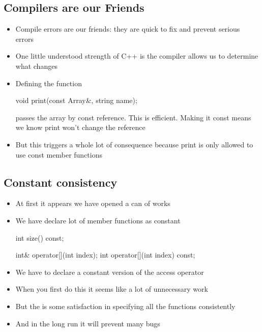 
\begin{slide}
\section{Compilers are our Friends}

\begin{itemize}
\item Compile errors are our friends\pause: they are quick to fix and
  prevent serious errors
\item One little understood strength of C++ is the compiler allows us
  to determine what changes
\item Defining the function
  \begin{cpp}
    void print(const Array&, string name);
  \end{cpp}
  \vspace*{-1cm}
  passes the array by const reference.  This is efficient.  Making it
  const means we know print won't change the reference
\item But this triggers a whole lot of consequence because print is
  only allowed to use const member functions
\end{itemize}
\end{slide}


\begin{slide}
\section[-1]{Constant consistency}

\begin{itemize}
\item At first it appears we have opened a can of works
\item We have declare lot of member functions as constant
  \begin{cpp}
    int size() const;

    int& operator[](int index);
    int operator[](int index) const;
  \end{cpp}
\item We have to declare a constant version of the access operator
\item When you first do this it seems like a lot of unnecessary work
\item But the is some satisfaction in specifying all the functions
  consistently
\item And in the long run it will prevent many bugs
\end{itemize}
\end{slide}

